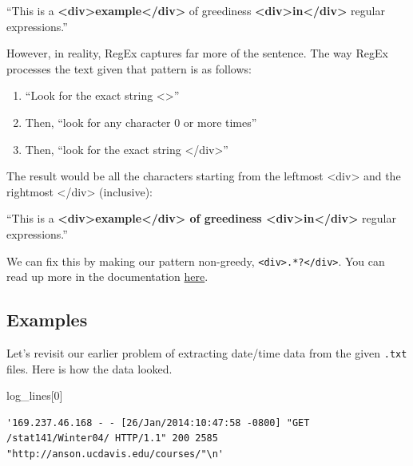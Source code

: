 \documentclass[
  letterpaper,
  DIV=11,
  numbers=noendperiod]{scrreprt}
\newenvironment{Shaded}{\begin{snugshade}}{\end{snugshade}}
\newcommand{\DecValTok}[1]{\textcolor[rgb]{0.68,0.00,0.00}{#1}}
\newcommand{\NormalTok}[1]{\textcolor[rgb]{0.00,0.23,0.31}{#1}}
\begin{document}
``This is a
\textbf{\textless div\textgreater example\textless/div\textgreater{}} of
greediness
\textbf{\textless div\textgreater in\textless/div\textgreater{}} regular
expressions.''

However, in reality, RegEx captures far more of the sentence. The way
RegEx processes the text given that pattern is as follows:

\begin{enumerate}
\def\labelenumi{\arabic{enumi}.}
\item
  ``Look for the exact string \textless{}\div\textgreater{}''
\item
  Then, ``look for any character 0 or more times''
\item
  Then, ``look for the exact string \textless/div\textgreater{}''
\end{enumerate}

The result would be all the characters starting from the leftmost
\textless div\textgreater{} and the rightmost
\textless/div\textgreater{} (inclusive):

``This is a
\textbf{\textless div\textgreater example\textless/div\textgreater{} of
greediness \textless div\textgreater in\textless/div\textgreater{}}
regular expressions.''

We can fix this by making our pattern non-greedy,
\texttt{\textless{}div\textgreater{}.*?\textless{}/div\textgreater{}}.
You can read up more in the documentation
\href{https://docs.python.org/3/howto/regex.html\#greedy-versus-non-greedy}{here}.

\subsection{Examples}\label{examples-2}

Let's revisit our earlier problem of extracting date/time data from the
given \texttt{.txt} files. Here is how the data looked.

\begin{Shaded}
\begin{Highlighting}[]
\NormalTok{log\_lines[}\DecValTok{0}\NormalTok{]}
\end{Highlighting}
\end{Shaded}

\begin{verbatim}
'169.237.46.168 - - [26/Jan/2014:10:47:58 -0800] "GET /stat141/Winter04/ HTTP/1.1" 200 2585 "http://anson.ucdavis.edu/courses/"\n'
\end{verbatim}
\end{document}
